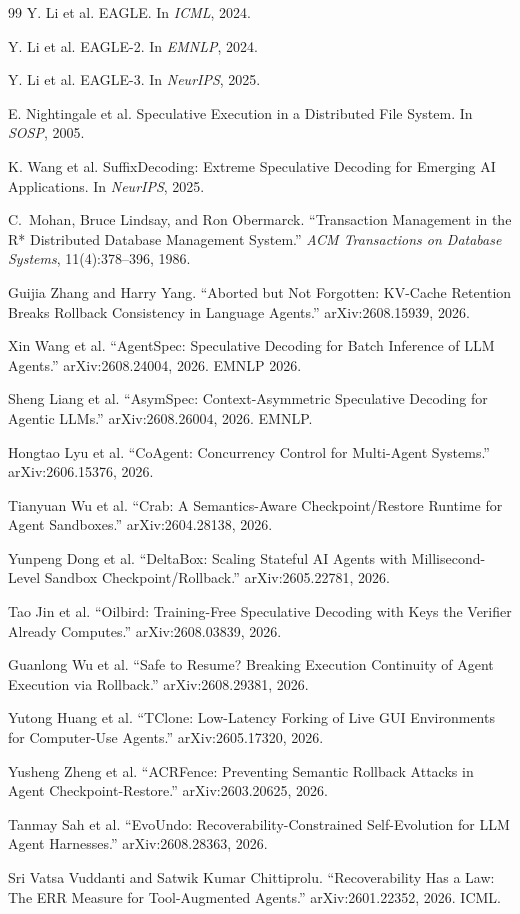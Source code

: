 \documentclass[11pt]{book}
\begin{document}
\begin{thebibliography}{99}
Y. Li et al.
\newblock EAGLE.
\newblock In {\em ICML}, 2024.

Y. Li et al.
\newblock EAGLE-2.
\newblock In {\em EMNLP}, 2024.

Y. Li et al.
\newblock EAGLE-3.
\newblock In {\em NeurIPS}, 2025.

E. Nightingale et al.
\newblock Speculative Execution in a Distributed File System.
\newblock In {\em SOSP}, 2005.

K. Wang et al.
\newblock SuffixDecoding: Extreme Speculative Decoding for Emerging AI Applications.
\newblock In {\em NeurIPS}, 2025.


C.~Mohan, Bruce Lindsay, and Ron Obermarck.
``Transaction Management in the R* Distributed Database Management System.''
\emph{ACM Transactions on Database Systems}, 11(4):378--396, 1986.

Guijia Zhang and Harry Yang.
``Aborted but Not Forgotten: KV-Cache Retention Breaks Rollback Consistency in Language Agents.''
arXiv:2608.15939, 2026.

Xin Wang et al.
``AgentSpec: Speculative Decoding for Batch Inference of LLM Agents.''
arXiv:2608.24004, 2026. EMNLP 2026.

Sheng Liang et al.
``AsymSpec: Context-Asymmetric Speculative Decoding for Agentic LLMs.''
arXiv:2608.26004, 2026. EMNLP.

Hongtao Lyu et al.
``CoAgent: Concurrency Control for Multi-Agent Systems.''
arXiv:2606.15376, 2026.

Tianyuan Wu et al.
``Crab: A Semantics-Aware Checkpoint/Restore Runtime for Agent Sandboxes.''
arXiv:2604.28138, 2026.

Yunpeng Dong et al.
``DeltaBox: Scaling Stateful AI Agents with Millisecond-Level Sandbox Checkpoint/Rollback.''
arXiv:2605.22781, 2026.

Tao Jin et al.
``Oilbird: Training-Free Speculative Decoding with Keys the Verifier Already Computes.''
arXiv:2608.03839, 2026.

Guanlong Wu et al.
``Safe to Resume? Breaking Execution Continuity of Agent Execution via Rollback.''
arXiv:2608.29381, 2026.

Yutong Huang et al.
``TClone: Low-Latency Forking of Live GUI Environments for Computer-Use Agents.''
arXiv:2605.17320, 2026.

Yusheng Zheng et al.
``ACRFence: Preventing Semantic Rollback Attacks in Agent Checkpoint-Restore.''
arXiv:2603.20625, 2026.

Tanmay Sah et al.
``EvoUndo: Recoverability-Constrained Self-Evolution for LLM Agent Harnesses.''
arXiv:2608.28363, 2026.

Sri Vatsa Vuddanti and Satwik Kumar Chittiprolu.
``Recoverability Has a Law: The ERR Measure for Tool-Augmented Agents.''
arXiv:2601.22352, 2026. ICML.
\end{thebibliography}
\end{document}
